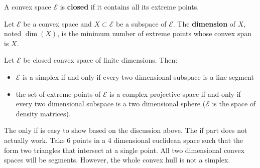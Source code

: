 \begin{defn}
	A convex space $\mathcal{E}$ is \textbf{closed} if it contains all its extreme points.
\end{defn}

\begin{defn}
	Let $\mathcal{E}$ be a convex space and $X \subset \mathcal{E}$ be a subspace of $\mathcal{E}$. The \textbf{dimension} of $X$, noted $\dim(X)$, is the minimum number of extreme points whose convex span is $X$.
\end{defn}

\begin{conj}
	Let $\mathcal{E}$ be closed convex space of finite dimensions. Then:
	\begin{itemize}
		\item $\mathcal{E}$ is a simplex if and only if every two dimensional subspace is a line segment
		\item the set of extreme points of $\mathcal{E}$ is a complex projective space if and only if every two dimensional subspace is a two dimensional sphere ($\mathcal{E}$ is the space of density matrices).
	\end{itemize}
\end{conj}

\begin{remark}
	The only if is easy to show based on the discussion above. The if part does not actually work. Take 6 points in a 4 dimensional euclidean space such that the form two triangles that intersect at a single point. All two dimensional convex spaces will be segments. However, the whole convex hull is not a simplex. 
\end{remark}

